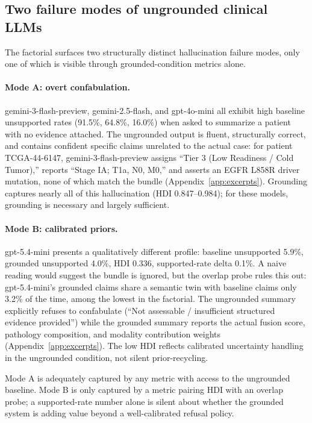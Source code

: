 \documentclass[11pt]{article}
\begin{document}
\subsection{Two failure modes of ungrounded clinical LLMs}

The factorial surfaces two structurally distinct hallucination failure modes, only one of which is visible through grounded-condition metrics alone.

\paragraph{Mode A: overt confabulation.}
gemini-3-flash-preview, gemini-2.5-flash, and gpt-4o-mini all exhibit high baseline unsupported rates (91.5\%, 64.8\%, 16.0\%) when asked to summarize a patient with no evidence attached. The ungrounded output is fluent, structurally correct, and contains confident specific claims unrelated to the actual case: for patient TCGA-44-6147, gemini-3-flash-preview assigns ``Tier 3 (Low Readiness / Cold Tumor),'' reports ``Stage IA; T1a, N0, M0,'' and asserts an EGFR L858R driver mutation, none of which match the bundle (Appendix~\ref{app:excerpts}). Grounding captures nearly all of this hallucination (HDI 0.847--0.984); for these models, grounding is necessary and largely sufficient.

\paragraph{Mode B: calibrated priors.}
gpt-5.4-mini presents a qualitatively different profile: baseline unsupported 5.9\%, grounded unsupported 4.0\%, HDI 0.336, supported-rate delta 0.1\%. A naive reading would suggest the bundle is ignored, but the overlap probe rules this out: gpt-5.4-mini's grounded claims share a semantic twin with baseline claims only 3.2\% of the time, among the lowest in the factorial. The ungrounded summary explicitly refuses to confabulate (``Not assessable / insufficient structured evidence provided'') while the grounded summary reports the actual fusion score, pathology composition, and modality contribution weights (Appendix~\ref{app:excerpts}). The low HDI reflects calibrated uncertainty handling in the ungrounded condition, not silent prior-recycling.

Mode A is adequately captured by any metric with access to the ungrounded baseline. Mode B is only captured by a metric pairing HDI with an overlap probe; a supported-rate number alone is silent about whether the grounded system is adding value beyond a well-calibrated refusal policy.
\end{document}
